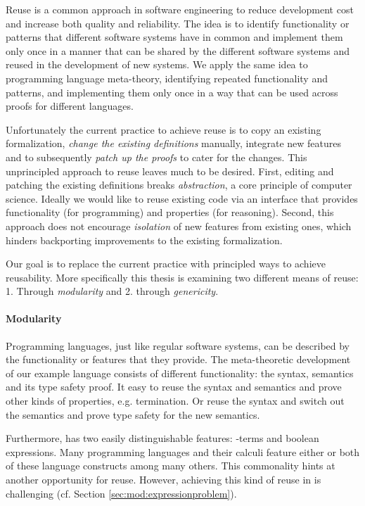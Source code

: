 {Reuse is a common approach in software engineering to reduce development cost
and increase both quality and reliability. The idea is to identify functionality
or patterns that different software systems have in common and implement them
only once in a manner that can be shared by the different software systems and
reused in the development of new systems. We apply the same idea to programming
language meta-theory, identifying repeated functionality and patterns, and
implementing them only once in a way that can be used across proofs for
different languages.

Unfortunately the current practice to achieve reuse is to copy an existing
formalization, \emph{change the existing definitions} manually, integrate new
features and to subsequently \emph{patch up the proofs} to cater for the
changes. This unprincipled approach to reuse leaves much to be desired. First,
editing and patching the existing definitions breaks \emph{abstraction}, a core
principle of computer science. Ideally we would like to reuse existing code via
an interface that provides functionality (for programming) and properties (for
reasoning). Second, this approach does not encourage \emph{isolation} of new
features from existing ones, which hinders backporting improvements to the
existing formalization.

Our goal is to replace the current practice with principled ways to achieve
reusability. More specifically this thesis is examining two different means of
reuse: 1. Through \emph{modularity} and 2. through \emph{genericity}.

\paragraph{Modularity}
Programming languages, just like regular software systems, can be described by
the functionality or features that they provide. The meta-theoretic development
of our example language \stlcbool consists of different functionality: the
syntax, semantics and its type safety proof. It easy to reuse the syntax and
semantics and prove other kinds of properties, e.g. termination. Or reuse the
syntax and switch out the semantics and prove type safety for the new semantics.

Furthermore, \stlcbool has two easily distinguishable features:
\textlambda-terms and boolean expressions. Many programming languages and their
calculi feature either or both of these language constructs among many others.
This commonality hints at another opportunity for reuse. However, achieving this
kind of reuse in is challenging (cf. Section \ref{sec:mod:expressionproblem}).

}
